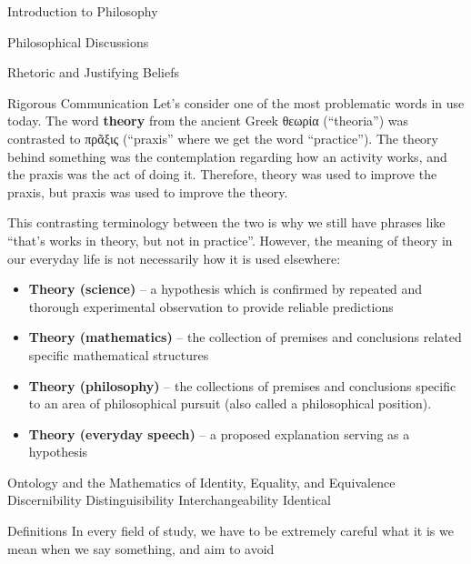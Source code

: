 \begin{chapter}{Introduction to Philosophy}
\begin{section}{Philosophical Discussions}
\begin{subsection}{Rhetoric and Justifying Beliefs}
\begin{subsubsection}{Rigorous Communication}
                Let's consider one of the most problematic words in use today. The word \textbf{theory} from the ancient Greek θεωρία (``theoria'') was contrasted to πρᾶξις (``praxis'' where we get the word ``practice''). The theory behind something was the contemplation regarding how an activity works, and the praxis was the act of doing it. Therefore, theory was used to improve the praxis, but praxis was used to improve the theory.
                    
                This contrasting terminology between the two is why we still have phrases like ``that's works in theory, but not in practice''. However, the meaning of theory in our everyday life is not necessarily how it is used elsewhere:
                    
                \begin{itemize}
                    \item \textbf{Theory (science)} -- a hypothesis which is confirmed by repeated and thorough experimental observation to provide reliable predictions
                    
                    \item \textbf{Theory (mathematics)} -- the collection of premises and conclusions related specific mathematical structures
                        
                    \item \textbf{Theory (philosophy)} -- the collections of premises and conclusions specific to an area of philosophical pursuit (also called a philosophical position).
                        
                    \item \textbf{Theory (everyday speech)} -- a proposed explanation serving as a hypothesis
                \end{itemize}
            \end{subsubsection}
                
                
        \end{subsection}
        \begin{subsection}{Ontology and the Mathematics of Identity, Equality, and Equivalence}
            Discernibility
            Distinguisibility
            Interchangeability
            Identical
                
            \begin{subsubsection}{Definitions}
                In every field of study, we have to be extremely careful what it is we mean when we say something, and aim to avoid
                    

\end{subsubsection}
\end{subsection}
\end{section}
\end{chapter}
